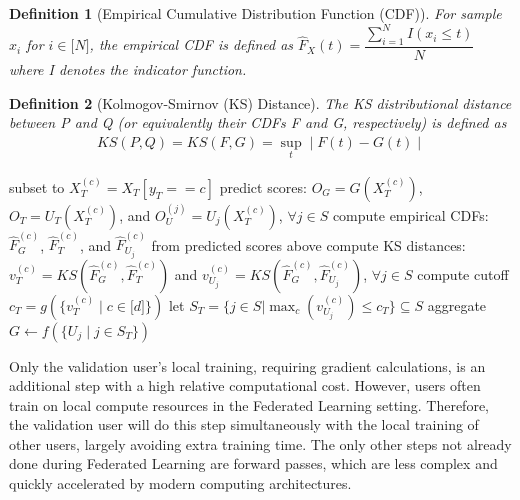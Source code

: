\documentclass{article} %
\newtheorem{definition}{Definition}
\begin{document}
\begin{definition}[Empirical Cumulative Distribution Function (CDF)]
For sample $x_i$ for $i \in \mathopen[ N \mathclose]$, the empirical CDF is defined as $\hat{F}_X(t) = \dfrac{\sum_{i=1}^{N} I(x_i \leq t)}{N}$ where I denotes the indicator function.
\end{definition}

\begin{definition}[Kolmogov-Smirnov (KS) Distance]
The KS distributional distance between P and Q (or equivalently their CDFs F and G, respectively) is defined as 
\begin{align*}
    KS(P, Q) = KS(F, G) = \sup_t \mid F(t) - G(t) \mid
\end{align*}
\end{definition}

\begin{algorithm}
\caption{\\The trusted user performs a local update of the global model, $U_T$, simultaneous to the local training of other users, using local data $(X_T, y_T)$. The trusted user's model is then used to determine the largest change to the output distribution possible by a benign user with balanced data.}\label{alg:m-fed-learn}
\begin{algorithmic}
        \State subset to $X_T^{(c)} = X_T[y_T == c]$
        \State predict scores: $O_G = G(X_T^{(c)})$, $O_{T} = {U_T}(X_T^{(c)})$, and $O_{U}^{(j)} = {U_j}(X_T^{(c)})$, $\forall j \in S$
        \State compute empirical CDFs: $\hat{F}_G^{(c)}$, $\hat{F}_T^{(c)}$, and $\hat{F}_{U_j}^{(c)}$ from predicted scores above
        \State compute KS distances: $v_T^{(c)} = KS(\hat{F}_G^{(c)}, \hat{F}_T^{(c)})$ and $v_{U_j}^{(c)} = KS(\hat{F}_G^{(c)}, \hat{F}_{U_j}^{(c)})$, $\forall j \in S$
    \EndFor
    \State compute cutoff $c_T = g( \{ v_T^{(c)} \mid c \in \mathopen[ d \mathclose] \} )$
    \State let $S_T = \{j \in S | \max_c (v_{U_j}^{(c)}) \leq c_T \} \subseteq S$
    \State \Return aggregate $G \gets f(\{U_j \mid j \in S_T \})$
    \EndProcedure
\end{algorithmic}
\end{algorithm}

Only the validation user's local training, requiring gradient calculations, is an additional step with a high relative computational cost. However, users often train on local compute resources in the Federated Learning setting. Therefore, the validation user will do this step simultaneously with the local training of other users, largely avoiding extra training time. The only other steps not already done during Federated Learning are forward passes, which are less complex and quickly accelerated by modern computing architectures.
\end{document}

